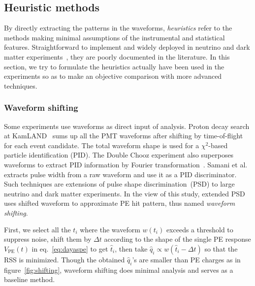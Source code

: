 \subsection{Heuristic methods}
By directly extracting the patterns in the waveforms, \textit{heuristics} refer to the methods making minimal assumptions of the instrumental and statistical features.  Straightforward to implement and widely deployed in neutrino and dark matter experiments~\cite{students22}, they are poorly documented in the literature.  In this section, we try to formulate the heuristics actually have been used in the experiments so as to make an objective comparison with more advanced techniques.

\subsubsection{Waveform shifting}
\label{sec:shifting}
Some experiments use waveforms as direct input of analysis. Proton decay search at KamLAND~\cite{kamland_collaboration_search_2015} sums up all the PMT waveforms after shifting by time-of-flight for each event candidate.  The total waveform shape is used for a $\chi^2$-based particle identification (PID). The Double Chooz experiment also superposes waveforms to extract PID information by Fourier transformation~\cite{chooz_2018}. Samani et al.\cite{samani_pulse_2020} extracts pulse width from a raw waveform and use it as a PID discriminator.  Such techniques are extensions of pulse shape discrimination~(PSD) to large neutrino and dark matter experiments.  In the view of this study, extended PSD uses shifted waveform to approximate PE hit pattern, thus named \textit{waveform shifting}.

First, we select all the $t_i$ where the waveform $w(t_i)$ exceeds a threshold to suppress noise, shift them by $\Delta t$ according to the shape of the single PE response $V_\mathrm{PE}(t)$ in eq.~\eqref{eq:dayaspe} to get $\hat{t}_i$, then take $\hat{q}_i \propto w(\hat{t}_i - \Delta t)$ so that the RSS is minimized.  Though the obtained $\hat{q}_i$'s are smaller than PE charges as in figure~\ref{fig:shifting}, waveform shifting does minimal analysis and serves as a baseline method.

